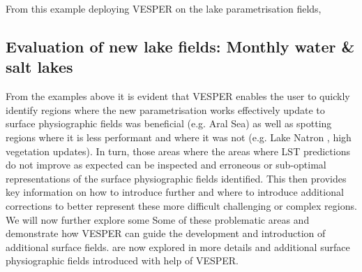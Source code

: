 \documentclass[hess, twostagejnl]{copernicus}
\providecommand{\DIFadd}[1]{{\protect\color{blue} \sf #1}} %
\providecommand{\DIFdel}[1]{{\protect\color{red} \scriptsize #1}} %
\providecommand{\DIFaddbegin}{} %
\providecommand{\DIFaddend}{} %
\providecommand{\DIFdelbegin}{} %
\providecommand{\DIFdelend}{} %
\begin{document}
	\DIFdelbegin %

\DIFdel{From  this example deploying VESPER on the lake parametrisation fields, }\DIFdelend \DIFaddbegin \subsection{\DIFadd{Evaluation of new lake fields: Monthly water \& salt lakes}}
\DIFadd{From  the examples  above  }\DIFaddend it  is  evident  that  VESPER  enables  the  user  to  quickly  identify  regions  where  the  \DIFdelbegin \DIFdel{new parametrisation works effectively }\DIFdelend \DIFaddbegin \DIFadd{update  to  surface physiographic fields was beneficial }\DIFaddend (e.g. Aral Sea) \DIFdelbegin \DIFdel{as well as spotting regions where it is less performant }\DIFdelend \DIFaddbegin \DIFadd{and where it was not }\DIFaddend (e.g. Lake Natron\DIFdelbegin \DIFdel{, high vegetation updates}\DIFdelend ). In turn, \DIFdelbegin \DIFdel{those areas where the }\DIFdelend \DIFaddbegin \DIFadd{areas where LST }\DIFaddend predictions do not improve as expected can be inspected and erroneous or sub-optimal representations of the surface  \DIFaddbegin \DIFadd{physiographic  }\DIFaddend fields  identified.  This  then  provides  key  information  on  how  \DIFdelbegin \DIFdel{to introduce further }\DIFdelend \DIFaddbegin \DIFadd{and  where  to  introduce  additional }\DIFaddend corrections to better represent these more \DIFdelbegin \DIFdel{difficult }\DIFdelend \DIFaddbegin \DIFadd{challenging }\DIFaddend or complex regions. \DIFdelbegin \DIFdel{We will now further explore some }\DIFdelend \DIFaddbegin \DIFadd{Some }\DIFaddend of these problematic areas \DIFdelbegin \DIFdel{and demonstrate how VESPER can guide the development and introduction of additional surface fields.
	}\DIFdelend \DIFaddbegin \DIFadd{are now explored in more details and additional surface physiographic fields introduced with help of VESPER. }\newline 
\end{document}
